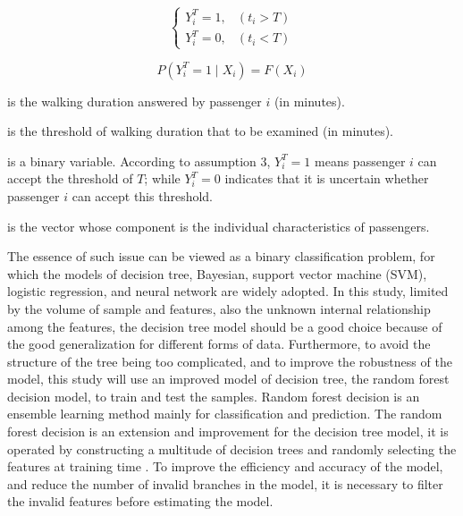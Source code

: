\begin{equation}
    \left\{\begin{matrix}
		Y^T_i=1,&(t_i>T) \\
		Y^T_i=0,&(t_i<T)
	\end{matrix}\right.
	\label{eq:chp4:threshold}
\end{equation}

\begin{equation}
	P(Y^T_i=1 \mid X_i)=F(X_i)
	\label{eq:chp4:probability}
\end{equation}

%
\begin{description}
	\setlength{\parskip}{0\baselineskip} %
	\normalsize
	\item[\textbf{Where:}]
	\item[$t_i$] is the walking duration answered by passenger $i$ (in minutes).
	\item[$T$] is the threshold of walking duration that to be examined (in minutes).
	\item[$Y^T_i$] is a binary variable. According to assumption 3, $Y^T_i=1$ means passenger $i$ can accept the threshold of $T$; while $Y^T_i=0$ indicates that it is uncertain whether passenger $i$ can accept this threshold.
	\item[$X_i$] is the vector whose component is the individual characteristics of passengers.
	\setlength{\parskip}{0.7\baselineskip} %
\end{description}

%
The essence of such issue can be viewed as a binary classification problem, for which the models of decision tree, Bayesian, support vector machine (SVM), logistic regression, and neural network are widely adopted. In this study, limited by the volume of sample and features, also the unknown internal relationship among the features, the decision tree model should be a good choice because of the good generalization for different forms of data. Furthermore, to avoid the structure of the tree being too complicated, and to improve the robustness of the model, this study will use an improved model of decision tree, the random forest decision model, to train and test the samples. Random forest decision is an ensemble learning method mainly for classification and prediction. The random forest decision is an extension and improvement for the decision tree model, it is operated by constructing a multitude of decision trees and randomly selecting the features at training time \cite{ho1995random,ho1998random}. To improve the efficiency and accuracy of the model, and reduce the number of invalid branches in the model, it is necessary to filter the invalid features before estimating the model.


